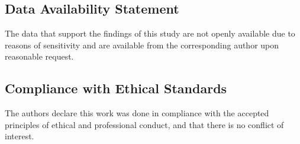 \documentclass[preprint,11pt,number]{elsarticle}
\begin{document}
\subsection*{Data Availability Statement}
The data that support the findings of this study are not openly available due to reasons of sensitivity and are available from the corresponding author upon reasonable request.

\subsection*{Compliance with Ethical Standards}
The authors declare this work was done in compliance with the accepted principles of ethical and professional conduct, and that there is no conflict of interest.




\end{document}
